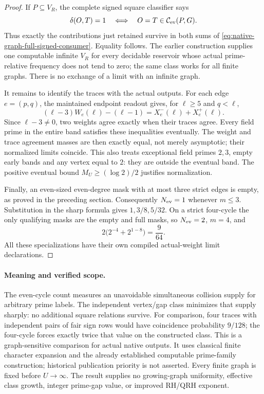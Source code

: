 \documentclass[11pt]{article}
\begin{document}
\begin{proof}
If \(P\subseteq V_R\), the complete signed square classifier says
\[
 \delta(O,T)=1
 \quad\Longleftrightarrow\quad
 O=T\in\mathcal C_{\rm ev}(P,G).
\]
Thus exactly the contributions just retained survive in both sums of
\eqref{eq:native-graph-full-signed-consumer}. Equality follows.
The earlier construction supplies one computable infinite \(V_R\)
for every decidable reservoir whose actual prime-relative frequency
does not tend to zero; the same class works for all finite graphs.
There is no exchange of a limit with an infinite graph.

It remains to identify the traces with the actual outputs.
For each edge \(e=(p,q)\), the maintained endpoint readout gives,
for \(\ell\geq5\) and \(q<\ell\),
\[
 (\ell-3)W_e(\ell)-(\ell-1)=X^-_e(\ell)+X^+_e(\ell).
\]
Since \(\ell-3\ne0\), two weights agree exactly when their traces
agree. Every field prime in the entire band satisfies these inequalities
eventually. The weight and trace agreement masses are then exactly
equal, not merely asymptotic; their normalized limits coincide.
This also treats exceptional field primes \(2,3\), empty early bands
and any vertex equal to \(2\): they are outside the eventual band.
The positive eventual bound \(M_U\geq(\log2)/2\) justifies normalization.

Finally, an even-sized even-degree mask with at most three strict
edges is empty, as proved in the preceding section.
Consequently \(N_{\rm ev}=1\) whenever \(m\leq3\).
Substitution in the sharp formula gives \(1,3/8,5/32\).
On a strict four-cycle the only qualifying masks are the empty
and full masks, so \(N_{\rm ev}=2\), \(m=4\), and
\[
 2\bigl(2^{-4}+2^{1-8}\bigr)=\frac9{64}.
\]
All these specializations have their own compiled actual-weight
limit declarations.
\end{proof}

\paragraph{Meaning and verified scope.}
The even-cycle count measures an unavoidable simultaneous collision
supply for arbitrary prime labels. The independent vertex/gap class
minimizes that supply sharply: no additional square relations survive.
For comparison, four traces with independent pairs of fair sign rows
would have coincidence probability \(9/128\); the four-cycle forces
exactly twice that value on the constructed class.
This is a graph-sensitive comparison for actual native outputs.
It uses classical finite character expansion and the already established
computable prime-family construction; historical publication priority
is not asserted.
Every finite graph is fixed before \(U\to\infty\).
The result supplies no growing-graph uniformity, effective class growth,
integer prime-gap value, or improved RH/QRH exponent.
\end{document}
